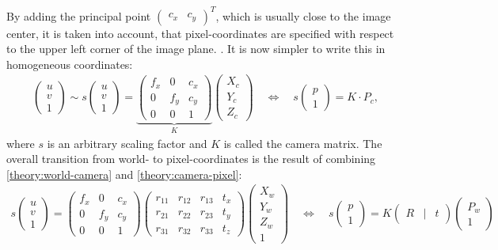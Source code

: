 By adding the principal point $\begin{pmatrix}c_x&c_y\end{pmatrix}^T$, which is usually close to the image center, it is taken into account, that pixel-coordinates are specified with respect to the upper left corner of the image plane. .
It is now simpler to write this in homogeneous coordinates:
\begin{align}
\begin{pmatrix}
u\\
v\\
1
\end{pmatrix}\sim s
\begin{pmatrix}
u\\
v\\
1
\end{pmatrix}=
\underbrace{\begin{pmatrix}
f_x&0&c_x\\
0&f_y&c_y\\
0&0&1
\end{pmatrix}}_{K}
\begin{pmatrix}
X_c\\
Y_c\\
Z_c
\end{pmatrix}\quad \Leftrightarrow \quad s
\begin{pmatrix}
p\\
1
\end{pmatrix}=
K\cdot P_c
\label{theory:camera-pixel},
\end{align}
where $s$ is an arbitrary scaling factor and $K$ is called the camera matrix.
The overall transition from world- to pixel-coordinates is the result of combining \ref{theory:world-camera} and \ref{theory:camera-pixel}:
\begin{align}
s
\begin{pmatrix}
u\\
v\\
1
\end{pmatrix}=
\begin{pmatrix}
f_x&0&c_x\\
0&f_y&c_y\\
0&0&1
\end{pmatrix}
\begin{pmatrix}
r_{11}&r_{12}&r_{13}&t_x\\
r_{21}&r_{22}&r_{23}&t_y\\
r_{31}&r_{32}&r_{33}&t_z
\end{pmatrix}
\begin{pmatrix}
X_w\\
Y_w\\
Z_w\\
1
\end{pmatrix}\quad \Leftrightarrow \quad s
\begin{pmatrix}
p\\
1
\end{pmatrix}=
K
\begin{pmatrix}
R&|&t
\end{pmatrix}
\begin{pmatrix}
P_w\\
1
\end{pmatrix}\label{theory:world-pixel}
\end{align}
